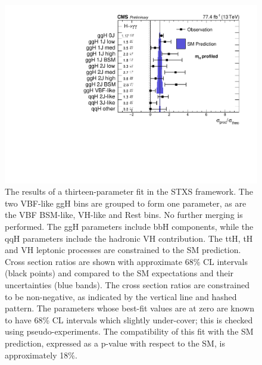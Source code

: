 \begin{figure}[hptb]
\centering
\includegraphics[width=\textwidth]{Figures/Results/Stage1Min.pdf}
\caption{
  The results of a thirteen-parameter fit in the STXS framework. 
  The two VBF-like ggH bins are grouped to form one parameter, 
  as are the VBF BSM-like, VH-like and Rest bins.
  No further merging is performed. 
  The ggH parameters include bbH components, 
  while the qqH parameters include the hadronic VH contribution. 
  The ttH, tH and VH leptonic processes are constrained to the SM prediction. 
  Cross section ratios are shown with approximate 68\% CL intervals (black points) 
  and compared to the SM expectations and their uncertainties (blue bands). 
  The cross section ratios are constrained to be non-negative, 
  as indicated by the vertical line and hashed pattern. 
  The parameters whose best-fit values are at zero are known to have 68\% CL intervals 
  which slightly under-cover; this is checked using pseudo-experiments. 
  The compatibility of this fit with the SM prediction, 
  expressed as a p-value with respect to the SM, is approximately 18\%.
}
\label{fig:results_Stage1Min}
\end{figure}

